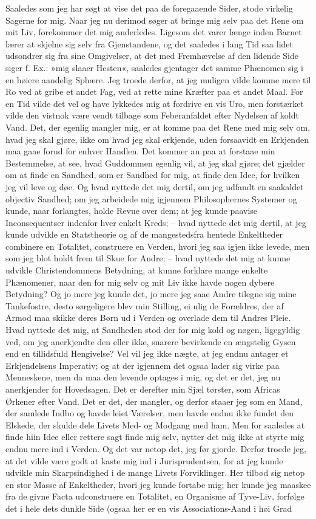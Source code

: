 \documentclass[12pt,a4paper]{article}
\begin{document}
Saaledes som jeg har søgt at vise det paa de foregaaende Sider, stode virkelig Sagerne for mig. Naar jeg nu derimod søger at bringe mig selv paa det Rene om mit Liv, forekommer det mig anderledes. Ligesom det varer længe inden Barnet lærer at skjelne sig selv fra Gjenstandene, og det saaledes i lang Tid saa lidet udsondrer sig fra sine Omgivelser, at det med Fremhævelse af den lidende Side siger f. Ex.: »mig slaaer Hesten«, saaledes gjentager det samme Phænomen sig i en høiere aandelig Sphære. Jeg troede derfor, at jeg muligen vilde komme mere til Ro ved at gribe et andet Fag, ved at rette mine Kræfter paa et andet Maal. For en Tid vilde det vel og have lykkedes mig at fordrive en vis Uro, men forstærket vilde den vistnok være vendt tilbage som Feberanfaldet efter Nydelsen af koldt Vand. Det, der egenlig mangler mig, er at komme paa det Rene med mig selv om, hvad jeg skal gjøre, ikke om hvad jeg skal erkjende, uden forsaavidt en Erkjenden maa gaae forud for enhver Handlen. Det kommer an paa at forstaae min Bestemmelse, at see, hvad Guddommen egenlig vil, at jeg skal gjøre; det gjælder om at finde en Sandhed, som er Sandhed for mig, at finde den Idee, for hvilken jeg vil leve og døe. Og hvad nyttede det mig dertil, om jeg udfandt en saakaldet objectiv Sandhed; om jeg arbeidede mig igjennem Philosophernes Systemer og kunde, naar forlangtes, holde Revue over dem; at jeg kunde paavise Inconsequentser indenfor hver enkelt Kreds; – hvad nyttede det mig dertil, at jeg kunde udvikle en Statstheorie og af de mangestedsfra hentede Enkeltheder combinere en Totalitet, construere en Verden, hvori jeg saa igjen ikke levede, men som jeg blot holdt frem til Skue for Andre; – hvad nyttede det mig at kunne udvikle Christendommens Betydning, at kunne forklare mange enkelte Phænomener, naar den for mig selv og mit Liv ikke havde nogen dybere Betydning? Og jo mere jeg kunde det, jo mere jeg saae Andre tilegne sig mine Tankefostre, desto sørgeligere blev min Stilling, ei ulig de Forældres, der af Armod maa skikke deres Børn ud i Verden og overlade dem til Andres Pleie. Hvad nyttede det mig, at Sandheden stod der for mig kold og nøgen, ligegyldig ved, om jeg anerkjendte den eller ikke, snarere bevirkende en ængstelig Gysen end en tillidsfuld Hengivelse? Vel vil jeg ikke nægte, at jeg endnu antager et Erkjendelsens Imperativ; og at der igjennem det ogsaa lader sig virke paa Menneskene, men da maa den levende optages i mig, og det er det, jeg nu anerkjender for Hovedsagen. Det er derefter min Sjæl tørster, som Africas Ørkener efter Vand. Det er det, der mangler, og derfor staaer jeg som en Mand, der samlede Indbo og havde leiet Værelser, men havde endnu ikke fundet den Elskede, der skulde dele Livets Med- og Modgang med ham. Men for saaledes at finde hiin Idee eller rettere sagt finde mig selv, nytter det mig ikke at styrte mig endnu mere ind i Verden. Og det var netop det, jeg før gjorde. Derfor troede jeg, at det vilde være godt at kaste mig ind i Jurisprudentsen, for at jeg kunde udvikle min Skarpsindighed i de mange Livets Forviklinger. Her tilbød sig netop en stor Masse af Enkeltheder, hvori jeg kunde fortabe mig; her kunde jeg maaskee fra de givne Facta udconstruere en Totalitet, en Organisme af Tyve-Liv, forfølge det i hele dets dunkle Side (ogsaa her er en vis Associations-Aand i høi Grad 
\end{document}
